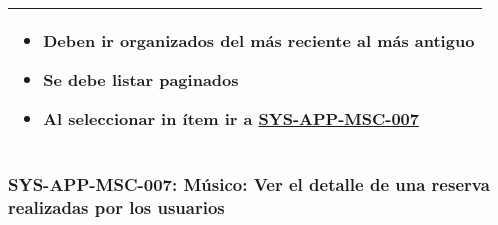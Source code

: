 \begin{table}[H]
{\begin{tabular}{|p{}|p{}|}
\multicolumn{2}{|p{\textwidth}|}{
\vspace{-\baselineskip}
\begin{itemize}[noitemsep]
    \item Deben ir organizados del más reciente al más antiguo
    \item Se debe listar paginados
    \item Al seleccionar in ítem ir a \hyperref[HU:SYS-APP-MSC-007]{SYS-APP-MSC-007}
\end{itemize}
} \\ \hline
\end{tabular}%
}
\end{table}

\subsubsection{SYS-APP-MSC-007: Músico: Ver el detalle de una reserva realizadas por los usuarios}
\label{HU:SYS-APP-MSC-007}
